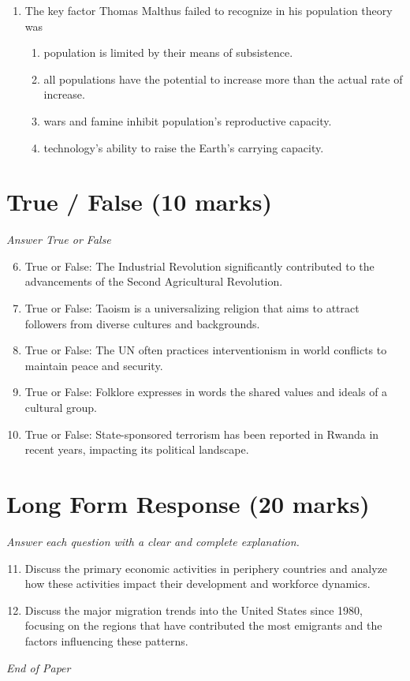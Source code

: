 \documentclass[12pt]{article}
\begin{document}
\begin{enumerate}[label=\arabic*.]
\begin{enumerate}[label=(\alph*)]
    \item locational interdependence.
\end{enumerate}
\item The key factor Thomas Malthus failed to recognize in his population theory was
\begin{enumerate}[label=(\alph*)]
    \item population is limited by their means of subsistence.
    \item all populations have the potential to increase more than the actual rate of increase.
    \item wars and famine inhibit population's reproductive capacity.
    \item technology's ability to raise the Earth's carrying capacity.
\end{enumerate}
\end{enumerate}

\section*{True / False (10 marks)}
\textit{Answer True or False}
\begin{enumerate}[label=\arabic*.]
\setcounter{enumi}{5}
\item True or False: The Industrial Revolution significantly contributed to the advancements of the Second Agricultural Revolution.
\item True or False: Taoism is a universalizing religion that aims to attract followers from diverse cultures and backgrounds.
\item True or False: The UN often practices interventionism in world conflicts to maintain peace and security.
\item True or False: Folklore expresses in words the shared values and ideals of a cultural group.
\item True or False: State-sponsored terrorism has been reported in Rwanda in recent years, impacting its political landscape.
\end{enumerate}

\section*{Long Form Response (20 marks)}
\textit{Answer each question with a clear and complete explanation.}
\begin{enumerate}[label=\arabic*.]
\setcounter{enumi}{10}
\item Discuss the primary economic activities in periphery countries and analyze how these activities impact their development and workforce dynamics.
\item Discuss the major migration trends into the United States since 1980, focusing on the regions that have contributed the most emigrants and the factors influencing these patterns.
\end{enumerate}

\vfill
\noindent\textit{End of Paper}
\end{document}
